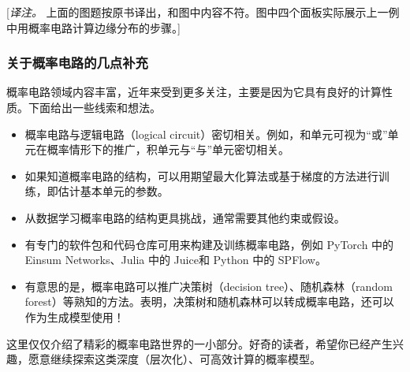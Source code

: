 [\emph{译注。} 上面的图题按原书译出，和图中内容不符。图中四个面板实际展示上一例中用概率电路计算边缘分布的步骤。]

\subsubsection{关于概率电路的几点补充}
概率电路领域内容丰富，近年来受到更多关注，主要是因为它具有良好的计算性质。下面给出一些线索和想法。
\begin{itemize}
\item 概率电路与逻辑电路（logical circuit）密切相关。例如，和单元可视为“或”单元在概率情形下的推广，积单元与“与”单元密切相关。
\item 如果知道概率电路的结构，可以用期望最大化算法或基于梯度的方法进行训练，即估计基本单元的参数。
\item 从数据学习概率电路的结构更具挑战，通常需要其他约束或假设。
\item 有专门的软件包和代码仓库可用来构建及训练概率电路，例如 PyTorch 中的 Einsum Networks、Julia 中的 Juice和 Python 中的 SPFlow。
\item 有意思的是，概率电路可以推广决策树（decision tree）、随机森林（random forest）等熟知的方法。表明，决策树和随机森林可以转成概率电路，还可以作为生成模型使用！
\end{itemize}

这里仅仅介绍了精彩的概率电路世界的一小部分。好奇的读者，希望你已经产生兴趣，愿意继续探索这类深度（层次化）、可高效计算的概率模型。


